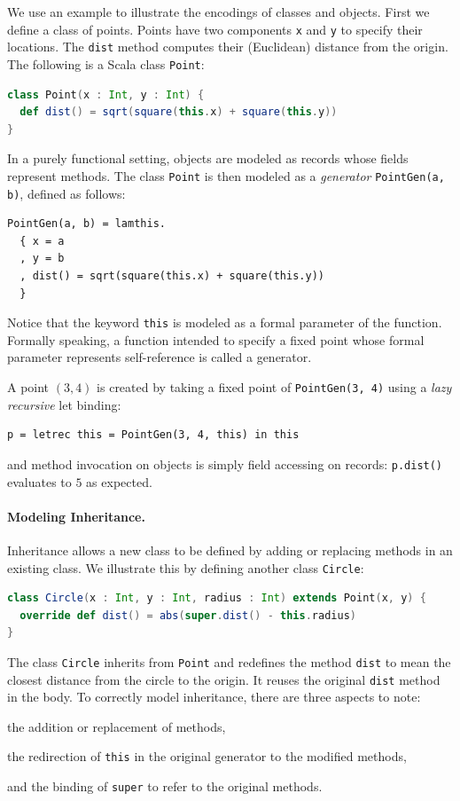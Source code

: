 We use an example to illustrate the encodings of classes and objects. First we
define a class of points. Points have two components \lstinline{x} and
\lstinline{y} to specify their locations. The \lstinline{dist} method computes
their (Euclidean) distance from the origin. The following is a Scala class
\lstinline{Point}:
\begin{lstlisting}[language=Scala]
class Point(x : Int, y : Int) {
  def dist() = sqrt(square(this.x) + square(this.y))
}
\end{lstlisting}

In a purely functional setting, objects are modeled as records whose fields
represent methods. The class \lstinline{Point} is then modeled as a
\textit{generator} \lstinline{PointGen(a, b)}, defined as follows:
\begin{lstlisting}[language=simple]
PointGen(a, b) = lamthis.
  { x = a
  , y = b
  , dist() = sqrt(square(this.x) + square(this.y))
  }
\end{lstlisting}
Notice that the keyword \lstinline{this} is modeled as a formal parameter of the
function. %
Formally speaking, a function intended to specify a fixed point whose formal
parameter represents self-reference is called a generator.

A point $(3, 4)$ is created by taking a fixed point of \lstinline{PointGen(3, 4)} using a
\textit{lazy recursive} let binding:
\begin{lstlisting}[language=simple]
p = letrec this = PointGen(3, 4, this) in this
\end{lstlisting}
and method invocation on objects is simply field accessing on records:
\lstinline{p.dist()} evaluates to $5$ as expected.

\paragraph{Modeling Inheritance.}

Inheritance allows a new class to be defined by adding or replacing methods in
an existing class. We illustrate this by defining another class \lstinline{Circle}:
\begin{lstlisting}[language=Scala]
class Circle(x : Int, y : Int, radius : Int) extends Point(x, y) {
  override def dist() = abs(super.dist() - this.radius)
}
\end{lstlisting}
The class \lstinline{Circle} inherits from \lstinline{Point} and redefines the
method \lstinline{dist} to mean the closest distance from the circle to the
origin. It reuses the original \lstinline{dist} method in the body.
To correctly model inheritance, there are three aspects to note:
\begin{inparaenum}[(1)]
\item the addition or replacement of methods,
\item the redirection of \lstinline{this} in the original generator to the modified methods,
\item and the binding of \lstinline{super} to refer to the original methods.
\end{inparaenum}

